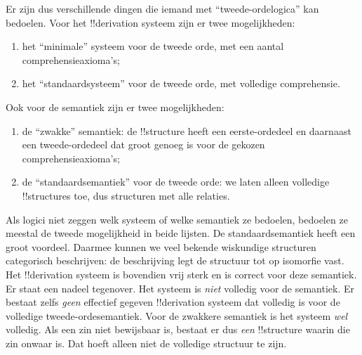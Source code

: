 \documentclass[openany]{memoir}
\begin{document}
Er zijn dus verschillende dingen die iemand met ``tweede-ordelogica'' kan
bedoelen. Voor het !!{derivation} systeem zijn er twee mogelijkheden:
\begin{enumerate}
\item het ``minimale'' systeem voor de tweede orde, met een aantal
  comprehensieaxioma's;
\item het ``standaardsysteem'' voor de tweede orde, met volledige
  comprehensie.
\end{enumerate}
Ook voor de semantiek zijn er twee mogelijkheden:
\begin{enumerate}
\item de ``zwakke'' semantiek: de !!{structure} heeft een eerste-ordedeel en
  daarnaast een tweede-ordedeel dat groot genoeg is voor de gekozen
  comprehensieaxioma's;
\item de ``standaardsemantiek'' voor de tweede orde: we laten alleen
  volledige !!{structure}s toe, dus structuren met alle relaties.
\end{enumerate}
Als logici niet zeggen welk systeem of welke semantiek ze bedoelen, bedoelen
ze meestal de tweede mogelijkheid in beide lijsten. De standaardsemantiek
heeft een groot voordeel. Daarmee kunnen we veel bekende wiskundige
structuren categorisch beschrijven: de beschrijving legt de structuur tot op
isomorfie vast. Het !!{derivation} systeem is bovendien vrij sterk en is
correct voor deze semantiek. Er staat een nadeel tegenover. Het systeem is
\emph{niet} volledig voor de semantiek. Er bestaat zelfs \emph{geen}
effectief gegeven !!{derivation} systeem dat volledig is voor de volledige
tweede-ordesemantiek. Voor de zwakkere semantiek is het systeem \emph{wel} volledig.
Als een zin niet bewijsbaar is, bestaat er dus \emph{een} !!{structure}
waarin die zin onwaar is. Dat hoeft alleen niet de volledige structuur te
zijn.
\end{document}

